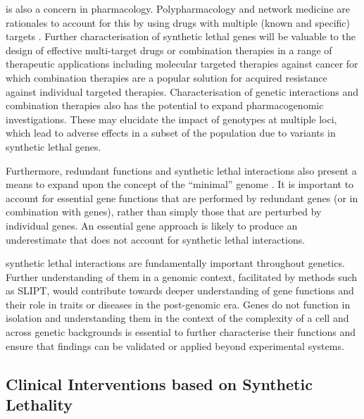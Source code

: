  is also a concern in pharmacology. Polypharmacology and network medicine are rationales to account for this by using drugs with multiple (known and specific) targets \citep{Hopkins2008, Barabasi2011}. Further characterisation of \gls{synthetic lethal} genes will be valuable to the design of effective multi-target drugs or combination therapies in a range of therapeutic applications including molecular targeted therapies against cancer for which combination therapies are a popular solution for acquired resistance against individual targeted therapies. Characterisation of genetic interactions and combination therapies also has the potential to expand pharmacogenomic investigations. These may elucidate the impact of genotypes at multiple loci, which lead to adverse effects in a subset of the population due to variants in \gls{synthetic lethal} genes.

Furthermore, redundant functions and \gls{synthetic lethal} interactions also present a means to expand upon the concept of the ``minimal'' \gls{genome} \citep{Hutchison2016}. It is important to account for \gls{essential} gene functions that are performed by redundant genes (or in combination with  genes), rather than simply those that are perturbed by individual genes. An \gls{essential} gene approach is likely to produce an underestimate that does not account for \gls{synthetic lethal} interactions. 

\Gls{synthetic lethal} interactions are fundamentally important throughout genetics. Further understanding of them in a \gls{genomic} context, facilitated by methods such as \gls{SLIPT}, would contribute towards deeper understanding of gene functions and their role in traits or diseases in the post-genomic era. Genes do not function in isolation and understanding them in the context of the complexity of a cell and across genetic backgrounds is \gls{essential} to further characterise their functions and ensure that findings can be validated or applied beyond experimental systems.


\subsection{Clinical Interventions based on Synthetic Lethality}
\label{chapt6:significance_clinic}

